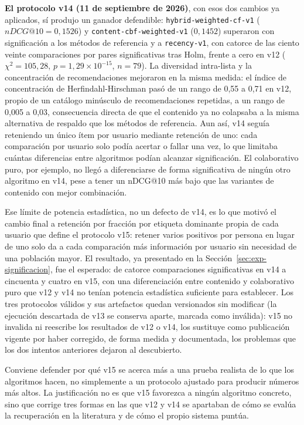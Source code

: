 \textbf{El protocolo v14 (11 de septiembre de 2026)}, con esos dos cambios ya aplicados, sí produjo un
ganador defendible: \texttt{hybrid-weighted-cf-v1} (\(nDCG@10=0{,}1526\)) y
\texttt{content-cbf-weighted-v1} (\(0{,}1452\)) superaron con significación a los métodos de referencia y
a \texttt{recency-v1}, con catorce de las ciento veinte comparaciones por pares significativas
tras Holm, frente a cero en v12 (\(\chi^2=105{,}28\), \(p=1{,}29\times10^{-15}\), \(n=79\)). La
diversidad intra-lista y la concentración de recomendaciones mejoraron en la misma medida: el
índice de concentración de Herfindahl-Hirschman pasó de un rango de 0,55 a 0,71 en v12, propio
de un catálogo minúsculo de recomendaciones repetidas, a un rango de 0,005 a 0,03, consecuencia
directa de que el contenido ya no colapsaba a la misma alternativa de respaldo que los métodos de referencia. Aun
así, v14 seguía reteniendo un único ítem por usuario mediante retención de uno: cada
comparación por usuario solo podía acertar o fallar una vez, lo que limitaba cuántas
diferencias entre algoritmos podían alcanzar significación. El colaborativo puro, por ejemplo,
no llegó a diferenciarse de forma significativa de ningún otro algoritmo en v14, pese a tener
un nDCG@10 más bajo que las variantes de contenido con mejor combinación.

Ese límite de potencia estadística, no un defecto de v14, es lo que motivó el cambio final a
retención por fracción por etiqueta dominante propia de cada usuario que define el
protocolo v15: retener varios positivos por persona en lugar de uno solo da a cada comparación
más información por usuario sin necesidad de una población mayor. El resultado, ya presentado
en la Sección~\ref{sec:exp-significacion}, fue el esperado: de catorce comparaciones
significativas en v14 a cincuenta y cuatro en v15, con una diferenciación entre contenido y
colaborativo puro que v12 y v14 no tenían potencia estadística suficiente para establecer.
Los tres protocolos válidos y sus artefactos quedan versionados sin modificar (la ejecución descartada de v13 se
conserva aparte, marcada como inválida): v15 no invalida ni
reescribe los resultados de v12 o v14, los sustituye como publicación vigente por haber
corregido, de forma medida y documentada, los problemas que los dos intentos anteriores dejaron
al descubierto.

Conviene defender por qué v15 se acerca más a una prueba realista de lo que los algoritmos
hacen, no simplemente a un protocolo ajustado para producir números más altos. La
justificación no es que v15 favorezca a ningún algoritmo concreto, sino que corrige tres
formas en las que v12 y v14 se apartaban de cómo se evalúa la recuperación en la literatura y
de cómo el propio sistema puntúa.


